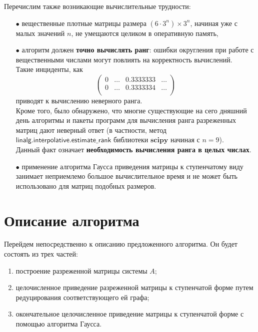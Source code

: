 \noindent Перечислим также возникающие вычислительные трудности:
\begin{itemize}
	\item[$\bullet$]{вещественные плотные матрицы размера $(6 \cdot 3^{n}) \times 3^{n}$, начиная уже с малых значений $n$, не умещаются целиком в оперативную память,}
	\item[$\bullet$]{алгоритм должен \textbf{точно вычислять ранг}: ошибки округления при работе с вещественными числами могут повлиять на корректность вы­числений.\\
		Такие инциденты, как
		\[
		\begin{pmatrix}
			0 & \dots & 0.3333333 & \dots \\
			0 & \dots & 0.3333334 & \dots \\
		\end{pmatrix}
		\]}приводят к вычислению неверного ранга.\\[0pt]

	Кроме того, было обнаружено, что многие существующие на сего­ дняшний день алгоритмы и пакеты программ для вычисления ран­га разреженных матриц дают неверный ответ (в частности, метод $\mathsf{linalg.interpolative.estimate\_rank}$ библиотеки $\mathbf{scipy}$ начиная с $n = 9$).\\[18pt]
	Данный факт означает \textbf{необходимость вычисления ранга в целых числах}.
	\item[$\bullet$]{применение алгоритма Гаусса приведения матрицы к ступенчатому ви­ду занимает неприемлемо большое вычислительное время и не может быть использовано для матриц подобных размеров.}
\end{itemize}

\section{Описание алгоритма}\label{sec:ch4/sect3}

Перейдем непосредственно к описанию предложенного алгоритма.
Он будет состоять из трех частей:
\begin{enumerate}
	\item{построение разреженной матрицы системы $A$};
	\item{целочисленное приведение разреженной матрицы к ступенчатой форме путем редуцирования соответствующего ей графа};
	\item{окончательное целочисленное приведение матрицы к ступенчатой форме с помощью
		алгоритма Гаусса}.
\end{enumerate}

